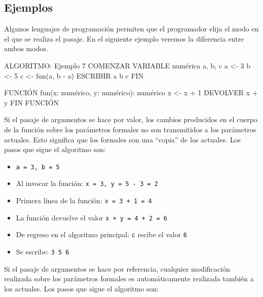\documentclass[
]{book}
\newenvironment{Shaded}{\begin{snugshade}}{\end{snugshade}}
\newcommand{\NormalTok}[1]{#1}
\providecommand{\tightlist}{%
  \setlength{\itemsep}{0pt}\setlength{\parskip}{0pt}}
\begin{document}
\hypertarget{ejemplos}{%
\subsection{Ejemplos}\label{ejemplos}}

Algunos lenguajes de programación permiten que el programador elija el modo en el que se realiza el pasaje. En el siguiente ejemplo veremos la diferencia entre ambos modos.

\begin{Shaded}
\begin{Highlighting}[]
\NormalTok{ALGORITMO: Ejemplo 7}
\NormalTok{COMENZAR}
\NormalTok{    VARIABLE numérica a, b, c}
\NormalTok{    a \textless{}{-} 3}
\NormalTok{    b \textless{}{-} 5}
\NormalTok{    c \textless{}{-} fun(a, b {-} a)}
\NormalTok{    ESCRIBIR a b c}
\NormalTok{FIN}

\NormalTok{FUNCIÓN fun(x: numérico, y: numérico): numérico}
\NormalTok{    x \textless{}{-} x + 1}
\NormalTok{    DEVOLVER x + y}
\NormalTok{FIN FUNCIÓN}
\end{Highlighting}
\end{Shaded}

Si el pasaje de argumentos se hace por valor, los cambios producidos en el cuerpo de la función sobre los parámetros formales no son transmitidos a los parámetros actuales. Esto significa que los formales son una ``copia'' de los actuales. Los pasos que sigue el algoritmo son:

\begin{itemize}
\tightlist
\item
  \texttt{a\ =\ 3,\ b\ =\ 5}
\item
  Al invocar la función: \texttt{x\ =\ 3,\ y\ =\ 5\ -\ 3\ =\ 2}
\item
  Primera línea de la función: \texttt{x\ =\ 3\ +\ 1\ =\ 4}
\item
  La función devuelve el valor \texttt{x\ +\ y\ =\ 4\ +\ 2\ =\ 6}
\item
  De regreso en el algoritmo principal: \texttt{c} recibe el valor \texttt{6}
\item
  Se escribe: \texttt{3\ 5\ 6}
\end{itemize}

Si el pasaje de argumentos se hace por referencia, cualquier modificación realizada sobre los parámetros formales es automáticamente realizada también a los actuales. Los pasos que sigue el algoritmo son:
\end{document}
